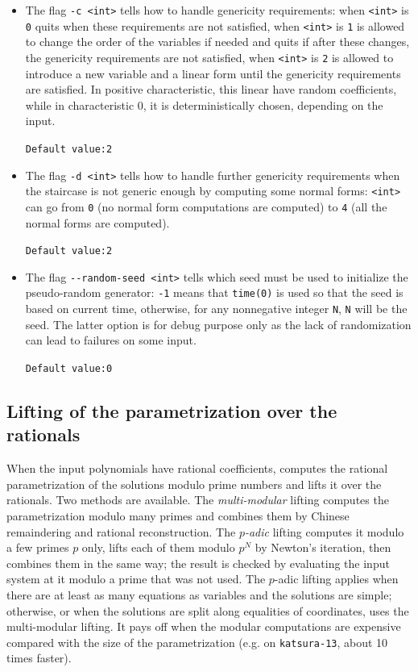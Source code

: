 \documentclass[a4paper,english,11pt]{scrartcl}
\theoremstyle{definition}
\theoremstyle{remark}
\begin{document}
\begin{itemize}
  \hfill \verb+Default value:0+

\item The flag \verb+-c <int>+ tells \msolve how to handle genericity
  requirements: when \verb+<int>+ is \verb+0+ \msolve quits when these
  requirements are not satisfied, when \verb+<int>+ is \verb+1+ \msolve is
  allowed to change the order of the variables if needed and quits if after
  these changes, the genericity requirements are not satisfied,  when
  \verb+<int>+ is \verb+2+ \msolve is allowed to introduce a new variable and a
  linear form until the genericity requirements are satisfied. In
  positive characteristic, this linear have random coefficients, while
  in characteristic $0$, it is deterministically chosen, depending on
  the input.

  \hfill \verb+Default value:2+

\item The flag \verb+-d <int>+ tells \msolve how to handle further genericity
  requirements when the staircase is not generic enough by computing some normal forms:
  \verb+<int>+ can go from \verb+0+ (no normal form computations are computed) to
  \verb+4+ (all the normal forms are computed).

  \hfill \verb+Default value:2+

\item The flag \verb+--random-seed <int>+ tells \msolve which seed must be used
  to initialize the pseudo-random generator: \verb+-1+ means that
  \verb+time(0)+ is used so that the seed is based on current time,
  otherwise, for any nonnegative integer \verb+N+, \verb+N+ will be the seed. The
  latter option is for debug purpose only as the lack of randomization
  can lead to failures on some input.

  \hfill \verb+Default value:0+

\end{itemize}

\subsection{Lifting of the parametrization over the rationals}\label{sec:lifting}

When the input polynomials have rational coefficients, \msolve computes the
rational parametrization of the solutions modulo prime numbers and lifts it
over the rationals. Two methods are available. The \emph{multi-modular}
lifting computes the parametrization modulo many primes and combines them by
Chinese remaindering and rational reconstruction. The \emph{$p$-adic} lifting
computes it modulo a few primes $p$ only, lifts each of them modulo $p^N$ by
Newton's iteration, then combines them in the same way; the result is
checked by evaluating the input system at it modulo a prime that was not
used. The $p$-adic lifting applies when there are at least as many
equations as variables and the solutions are simple; otherwise, or when the
solutions are split along equalities of coordinates, \msolve uses the
multi-modular lifting. It pays off when the modular computations are
expensive compared with the size of the parametrization (e.g. on
\texttt{katsura-13}, about 10 times faster).
\end{document}
